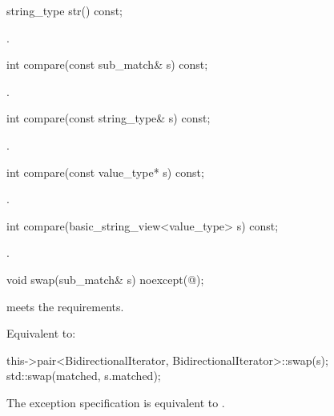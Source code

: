 %
\begin{itemdecl}
string_type str() const;
\end{itemdecl}

\begin{itemdescr}
\pnum
\returns
{}.
\end{itemdescr}

%
\begin{itemdecl}
int compare(const sub_match& s) const;
\end{itemdecl}

\begin{itemdescr}
\pnum
\returns
{}.
\end{itemdescr}

%
\begin{itemdecl}
int compare(const string_type& s) const;
\end{itemdecl}

\begin{itemdescr}
\pnum
\returns
{}.
\end{itemdescr}

%
\begin{itemdecl}
int compare(const value_type* s) const;
\end{itemdecl}

\begin{itemdescr}
\pnum
\returns
{}.
\end{itemdescr}

%
\begin{itemdecl}
int compare(basic_string_view<value_type> s) const;
\end{itemdecl}

\begin{itemdescr}
\pnum
\returns
{}.
\end{itemdescr}

%
\begin{itemdecl}
void swap(sub_match& s) noexcept(@\seebelow@);
\end{itemdecl}

\begin{itemdescr}
\pnum
\expects
{} meets
the  requirements.

\pnum
\effects
Equivalent to:
\begin{codeblock}
this->pair<BidirectionalIterator, BidirectionalIterator>::swap(s);
std::swap(matched, s.matched);
\end{codeblock}

\pnum
\remarks
The exception specification is equivalent to
.
\end{itemdescr}

